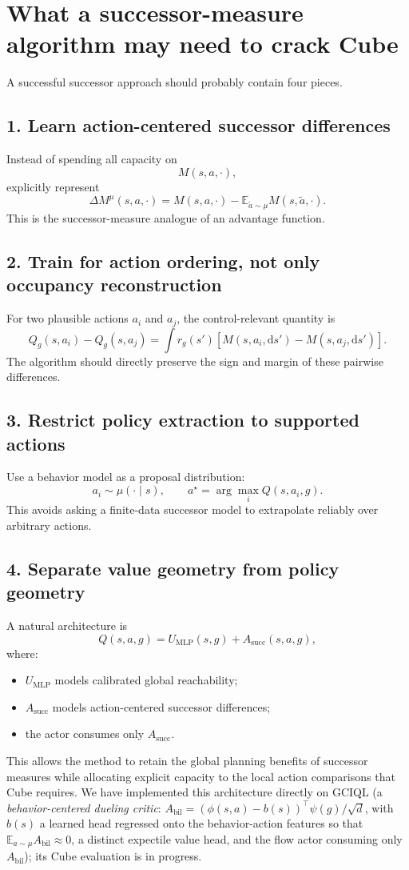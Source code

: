 \documentclass[12pt]{article}
\begin{document}
\section*{What a successor-measure algorithm may need to crack Cube}
A successful successor approach should probably contain four pieces.

\subsection*{1. Learn action-centered successor differences}
Instead of spending all capacity on
$$ M(s,a,\cdot), $$
explicitly represent
$$ \Delta M^\mu(s,a,\cdot) = M(s,a,\cdot) - \mathbb E_{\tilde a\sim\mu}M(s,\tilde a,\cdot). $$
This is the successor-measure analogue of an advantage function.

\subsection*{2. Train for action ordering, not only occupancy reconstruction}
For two plausible actions $a_i$ and $a_j$, the control-relevant quantity is
$$ Q_g(s,a_i)-Q_g(s,a_j) = \int r_g(s') \left[ M(s,a_i,\mathrm ds') - M(s,a_j,\mathrm ds') \right]. $$
The algorithm should directly preserve the sign and margin of these pairwise differences.

\subsection*{3. Restrict policy extraction to supported actions}
Use a behavior model as a proposal distribution:
$$ a_i\sim\mu(\cdot\mid s), \qquad a^\star=\arg\max_i Q(s,a_i,g). $$
This avoids asking a finite-data successor model to extrapolate reliably over arbitrary actions.

\subsection*{4. Separate value geometry from policy geometry}
A natural architecture is
$$ Q(s,a,g) = U_{\mathrm{MLP}}(s,g) + A_{\mathrm{succ}}(s,a,g), $$
where:
\begin{itemize}
    \item $U_{\mathrm{MLP}}$ models calibrated global reachability;
    \item $A_{\mathrm{succ}}$ models action-centered successor differences;
    \item the actor consumes only $A_{\mathrm{succ}}$.
\end{itemize}
This allows the method to retain the global planning benefits of successor measures while allocating explicit capacity to the local action comparisons that Cube requires. We have implemented this architecture directly on GCIQL (a \emph{behavior-centered dueling critic}: $A_{\mathrm{bil}}=(\phi(s,a)-b(s))^\top\psi(g)/\sqrt d$, with $b(s)$ a learned head regressed onto the behavior-action features so that $\mathbb E_{a\sim\mu}A_{\mathrm{bil}}\approx 0$, a distinct expectile value head, and the flow actor consuming only $A_{\mathrm{bil}}$); its Cube evaluation is in progress.
\end{document}
